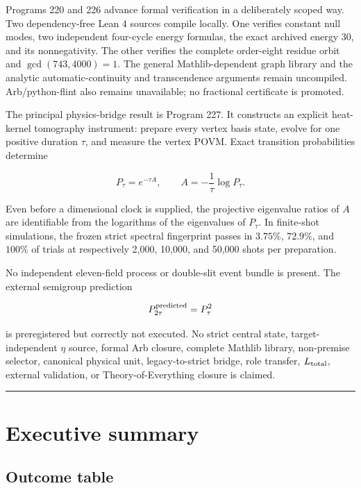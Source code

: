 \documentclass[11pt,a4paper,openany]{report}
\begin{document}
Programs 220 and 226 advance formal verification in a deliberately scoped way. Two dependency-free Lean 4 sources compile locally. One verifies constant null modes, two independent four-cycle energy formulas, the exact archived energy \(30\), and its nonnegativity. The other verifies the complete order-eight residue orbit and \(\gcd(743,4000)=1\). The general Mathlib-dependent graph library and the analytic automatic-continuity and transcendence arguments remain uncompiled. Arb/\allowbreak{}python-flint also remains unavailable; no fractional certificate is promoted.

The principal physics-bridge result is Program 227. It constructs an explicit heat-kernel tomography instrument: prepare every vertex basis state, evolve for one positive duration \(\tau\), and measure the vertex POVM. Exact transition probabilities determine

\[
P_\tau=e^{-\tau A},
\qquad
A=-\frac1\tau\log P_\tau.
\]

Even before a dimensional clock is supplied, the projective eigenvalue ratios of \(A\) are identifiable from the logarithms of the eigenvalues of \(P_\tau\). In finite-shot simulations, the frozen strict spectral fingerprint passes in \(3.75\%\), \(72.9\%\), and \(100\%\) of trials at respectively 2,000, 10,000, and 50,000 shots per preparation.

No independent eleven-field process or double-slit event bundle is present. The external semigroup prediction

\[
P_{2\tau}^{\rm predicted}=P_\tau^2
\]

is preregistered but correctly not executed. No strict central state, target-independent \(\eta\) source, formal Arb closure, complete Mathlib library, non-premise selector, canonical physical unit, legacy-to-strict bridge, role transfer, \(L_{\rm total}\), external validation, or Theory-of-Everything closure is claimed.

\par\medskip\hrule\medskip

\chapter{Executive summary}

\section{Outcome table}
\end{document}
